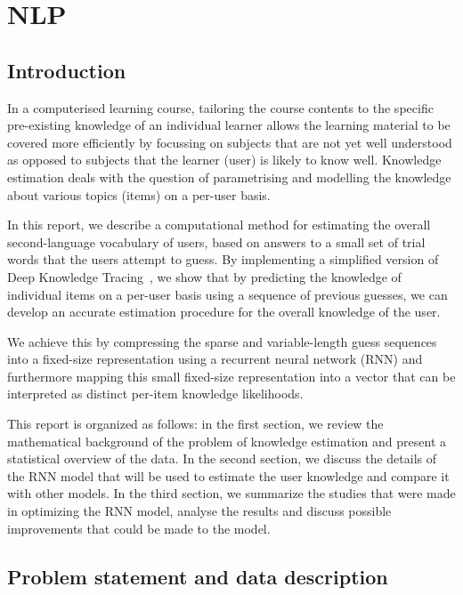 \section{NLP}
\subsection{Introduction}

In a computerised learning course, tailoring the course contents to the specific pre-existing knowledge of an individual learner allows the learning material to be covered more efficiently by focussing on subjects that are not yet well understood as opposed to subjects that the learner (user) is likely to know well. Knowledge estimation deals with the question of parametrising and modelling the knowledge about various topics (items) on a per-user basis. 

In this report, we describe a computational method for estimating the overall second-language vocabulary of users, based on answers to a small set of trial words that the users attempt to guess. By implementing a simplified version of Deep Knowledge Tracing~\cite{DBLP:journals/corr/PiechSHGSGS15}, we show that by predicting the knowledge of individual items on a per-user basis using a sequence of previous guesses, we can develop an accurate estimation procedure for the overall knowledge of the user.

We achieve this by compressing the sparse and variable-length guess sequences into a fixed-size representation using a recurrent neural network (RNN) and furthermore mapping this small fixed-size representation into a vector that can be interpreted as distinct per-item knowledge likelihoods.

This report is organized as follows: in the first section, we review the mathematical background of the problem of knowledge estimation and present a statistical overview of the data. In the second section, we discuss the details of the RNN model that will be used to estimate the user knowledge and compare it with other models. In the third section, we summarize the studies that were made in optimizing the RNN model, analyse the results and discuss possible improvements that could be made to the model.

\subsection{Problem statement and data description}

